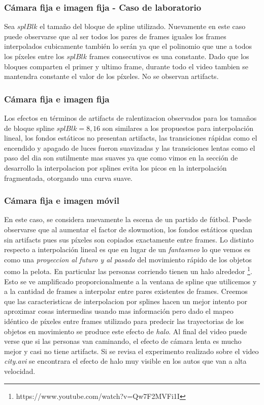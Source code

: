 \subsubsection{Cámara fija e imagen fija - Caso de laboratorio}
Sea $splBlk$ el tamaño del bloque de spline utilizado. Nuevamente en este caso puede observarse que al ser todos los pares de frames iguales los frames interpolados cubicamente también lo serán ya que el polinomio que une a todos los píxeles entre los $splBlk$ frames consecutivos es una constante. Dado que los bloques comparten el primer y ultimo frame, durante todo el video tambien se mantendra constante el valor de los píxeles. No se observan artifacts.

\subsubsection{Cámara fija e imagen fija}
Los efectos en términos de artifacts de ralentizacion observados para los tamaños de bloque spline $splBlk = 8, 16$ son similares a los propuestos para interpolación lineal, los fondos estáticos no presentan artifacts, las transiciones rápidas como el encendido y apagado de luces fueron suavizadas y las transiciones lentas como el paso del dia son sutilmente mas suaves ya que como vimos en la sección de desarrollo la interpolacion por splines evita los picos en la interpolación fragmentada, otorgando una curva suave.

\subsubsection{Cámara fija e imagen móvil}
En este caso, se considera nuevamente la escena de un partido de fútbol. Puede observarse que al aumentar el factor de slowmotion, los fondos estáticos quedan sin artifacts pues sus píxeles son copiados exactamente entre frames. Lo distinto respecto a interpolación lineal es que en lugar de un \emph{fantasmeo} lo que vemos es como una \emph{proyeccion al futuro y al pasado} del movimiento rápido de los objetos como la pelota. En particular las personas corriendo tienen un halo alrededor \footnote{https://www.youtube.com/watch?v=Qw7F2MVFi1I}. Esto se ve amplificado proporcionalmente a la ventana de spline que utilicemos y a la cantidad de frames a interpolar entre pares existentes de frames. Creemos que las caracteristicas de interpolacion por splines hacen un mejor intento por aproximar cosas intermedias usando mas información pero dado el mapeo idéntico de píxeles entre frames utilizado para predecir las trayectorias de los objetos en movimiento se produce este efecto de \emph{halo}. Al final del video puede verse que si las personas van caminando, el efecto de cámara lenta es mucho mejor y casi no tiene artifacts.
Si se revisa el experimento realizado sobre el video \emph{city.avi} se encontrara el efecto de halo muy visible en los autos que van a alta velocidad. 


